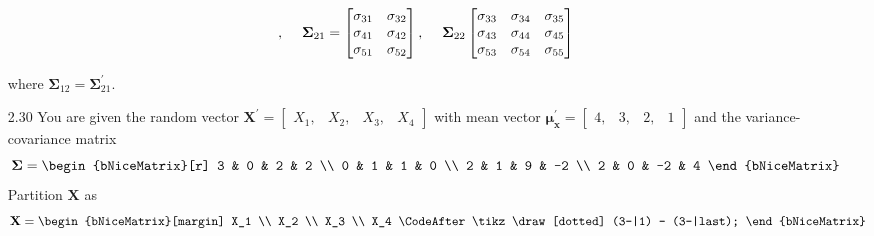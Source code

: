 \begin{enumerate}[font=\bfseries]
\[            \text{,}\hspace{0.2in}
            \mathbf{\Sigma}_{21}
            =
            \begin{bmatrix}
                \sigma_{31} & \sigma_{32} \\
                \sigma_{41} & \sigma_{42} \\
                \sigma_{51} & \sigma_{52}
            \end{bmatrix}
            \text{,}\hspace{0.2in}
            \mathbf{\Sigma}_{22}
            \begin{bmatrix}
                \sigma_{33} & \sigma_{34} & \sigma_{35} \\
                \sigma_{43} & \sigma_{44} & \sigma_{45} \\
                \sigma_{53} & \sigma_{54} & \sigma_{55}
            \end{bmatrix}
        \]
        \par
        where $\mathbf{\Sigma}_{12} = \mathbf{\Sigma}_{21}^\prime$.
        \item[2.30] You are given the random vector $\mathbf{X}^\prime = \begin{bmatrix}
            X_1, & X_2, & X_3, & X_4
        \end{bmatrix}$ with mean vector $\boldsymbol{\mu}_\mathbf{x}^\prime = \begin{bmatrix}
            4, & 3, & 2, & 1
        \end{bmatrix}$ and the variance-covariance matrix
        \[
            \mathbf{\Sigma}
            =
            \begin{bNiceMatrix}[r]
                3 & 0 & 2 & 2 \\
                0 & 1 & 1 & 0 \\
                2 & 1 & 9 & -2 \\
                2 & 0 & -2 & 4
            \end{bNiceMatrix}
        \]
        Partition $\mathbf{X}$ as
        \[
            \mathbf{X}
            =
            \begin{bNiceMatrix}[margin]
                X_1 \\
                X_2 \\
                X_3 \\
                X_4
                \CodeAfter \tikz \draw[dotted] (3-|1) -- (3-|last);

\end{bNiceMatrix}\]
\end{enumerate}
